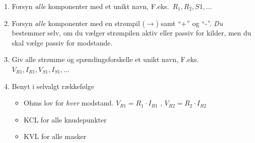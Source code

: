 \begin{enumerate}
    \item Forsyn \emph{alle} komponenter med et unikt navn, F.eks.\ $R_1,R_2,S1,\ldots$
    \item Forsyn \emph{alle} komponenter med en strømpil ($\rightarrow$) samt ``+'' og ``-''. \emph{Du} bestemmer selv, om du vælger strømpilen aktiv eller passiv for kilder, men du skal vælge passiv for modstande.
    \item Giv alle strømme og spændingsforskelle et unikt navn, F.eks.\ $V_{R1},I_{R1},V_{S1},I_{S1},\ldots$
    \item Benyt i selvalgt rækkefølge
	\begin{itemize}
	    \item Ohms lov for \emph{hver} modstand. $V_{R1}=R_1\cdot I_{R1}$ , $V_{R2}=R_2\cdot I_{R2}$
	    \item KCL for alle knudepunkter
	    \item KVL for alle masker
	\end{itemize}
\end{enumerate}

